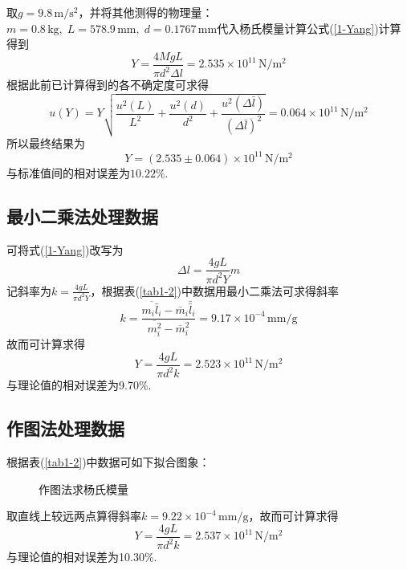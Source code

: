 \documentclass[UTF-8,twoside,cs4size]{ctexart}
\begin{document}
	取$ g=9.8\,\mathrm{m/s^2} $，并将其他测得的物理量：$ m=0.8\,\mathrm{kg},\;L=578.9\,\mathrm{mm},\;d=0.1767\,\mathrm{mm} $代入杨氏模量计算公式(\ref{1-Yang})计算得到
	\[Y=\frac{4MgL}{\pi d^2\Delta l}=2.535\times10^{11}\,\mathrm{N/m^2}\]
	根据此前已计算得到的各不确定度可求得
	\[u(Y)=Y\sqrt{\frac{u^2(L)}{L^2}+\frac{u^2(d)}{d^2}+\frac{u^2(\Delta\bar l)}{(\Delta\bar l)^2}}=0.064\times10^{11}\,\mathrm{N/m^2}\]
	所以最终结果为
	\[Y=(2.535\pm 0.064)\times10^{11}\,\mathrm{N/m^2}\]
	与标准值间的相对误差为$ 10.22\% $.
	
	\subsection{最小二乘法处理数据}
	
	可将式(\ref{1-Yang})改写为
	\[\Delta l=\frac{4gL}{\pi d^2Y}m\]
	记斜率为$ k=\frac{4gL}{\pi d^2Y} $，根据表(\ref{tab1-2})中数据用最小二乘法可求得斜率
	\[k=\frac{\overline{m_i\bar l_i}-\overline m_i\bar{\bar l}_i}{\overline{m_i^2}-\overline m_i^2}=9.17\times10^{-4}\,\mathrm{mm/g}\]
	故而可计算求得
	\[Y=\frac{4gL}{\pi d^2k}=2.523\times10^{11}\,\mathrm{N/m^2}\]
	与理论值的相对误差为9.70\%.
	
	\subsection{作图法处理数据}
	根据表(\ref{tab1-2})中数据可如下拟合图象：
	
	\begin{figure}[!h]
		\centering
		\caption{作图法求杨氏模量}
	\end{figure}
	取直线上较远两点算得斜率$ k=9.22\times10^{-4}\,\mathrm{mm/g} $，故而可计算求得
	\[Y=\frac{4gL}{\pi d^2k}=2.537\times10^{11}\,\mathrm{N/m^2}\]
	与理论值的相对误差为10.30\%.
	\newpage
	
\end{document}
